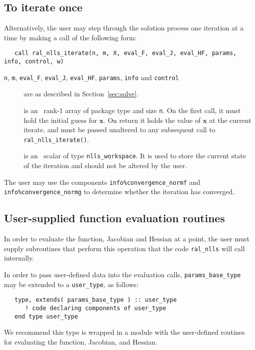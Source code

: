 \documentclass{spec}
\begin{document}
\subsection{To iterate once}
\label{sec:iterate}
Alternatively, the user may step through the solution process one iteration at
a time by making a call of the following form:

\begin{verbatim}
   call ral_nlls_iterate(n, m, X, eval_F, eval_J, eval_HF, params, info, control, w)
\end{verbatim}

\begin{description}

\item[\texttt{n}, \texttt{m}, \texttt{eval\_F}, \texttt{eval\_J}, \texttt{eval\_HF}, \texttt{params}, \texttt{info} and \texttt{control}] are as described in Section~\ref{sec:solve}.

 is an \intentinout\  rank-1 array of package type 
and size {\tt n}.  On the first call, it must hold the initial guess for
$\bm x$. On return it holds the value of $\bm x$ at the current iterate, and
must be passed unaltered to any subsequent call to \texttt{ral\_nlls\_iterate()}.

 is an \intentinout\ scalar of type \texttt{nlls\_workspace}. It is used
to store the current state of the iteration and should not be altered by the
user.

\end{description}

The user may use the components \texttt{info\%convergence\_normf} and
\texttt{info\%convergence\_normg} to determine whether the iteration has
converged.

\subsection{User-supplied function evaluation routines}
\label{sec::function_eval}
In order to evaluate the function, Jacobian and Hessian at a point, the user
must supply subroutines that perform this operation that the code
{\tt ral\_nlls} will call internally.  

In order to pass user-defined data into the evaluation calls, {\tt params\_base\_type} may be extended to a {\tt user\_type}, as follows:
\begin{verbatim}
   type, extends( params_base_type ) :: user_type
      ! code declaring components of user_type 
   end type user_type
\end{verbatim}
We recommend this type is wrapped in a module with the user-defined routines
for evaluating the function, Jacobian, and Hessian.
\end{document}

